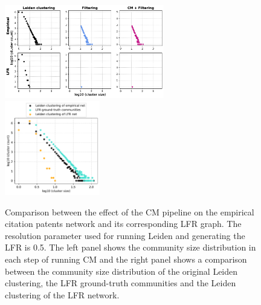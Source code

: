 \documentclass[a4paper]{article}   	%
\begin{document}
\begin{figure}[h!]
\centering
\includegraphics[width=0.62\textwidth]{figs/cit_patents_cm_steps_lfr5.pdf}
\includegraphics[width=0.37\textwidth]{figs/cit_patents_5_cm_size.pdf}
\caption[CM pipeline on the empirical citation patents network and its model LFR graph for r=0.5]{Comparison between the effect of the CM pipeline on the empirical citation patents network and its corresponding LFR graph. The resolution parameter used for running Leiden and generating the LFR is 0.5. The left panel shows the community size distribution in each step of running CM and the right panel shows a comparison between the community size distribution of the original Leiden clustering, the LFR ground-truth communities and the Leiden clustering of the LFR network.}
\label{fig:2cliques}
\end{figure}



\end{document}
